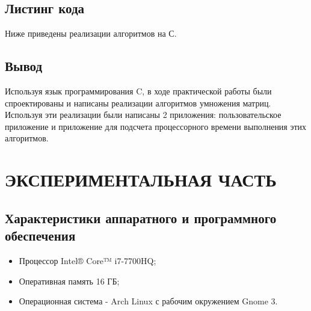 \documentclass[a4paper,12pt]{article}
\begin{document}
\newpage
\subsection{Листинг кода}
Ниже приведены реализации алгоритмов на С.\\


\newpage

\newpage
%

\newpage
\subsection{Вывод}
Используя язык программирования C, в ходе практической работы были спроектированы и написаны реализации алгоритмов умножения матриц. Используя эти реализации были написаны 2 приложения: пользовательское приложение и приложение для подсчета процессорного времени выполнения этих алгоритмов.

\newpage
\section{ЭКСПЕРИМЕНТАЛЬНАЯ ЧАСТЬ}
\subsection{Характеристики аппаратного и программного обеспечения}
\begin{itemize}
\item Процессор Intel® Core™ i7-7700HQ;
\item Оперативная память 16 ГБ;
\item Операционная система - Arch Linux с рабочим окружением Gnome 3.
\end{itemize}
\end{document}

